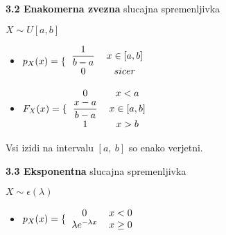 \documentclass{article}
\begin{document}
\begin{multicols}{3}
	\textbf{3.2 Enakomerna zvezna} slucajna spremenljivka
	\begin{center}
		\begin{math}
			X \sim U[a, b]
		\end{math}
	\end{center}

	\begin{itemize}
		\item  \begin{math}
			      p_{X}(x) =
			      \{\begin{tabular}{ccc}
				      $\dfrac{1}{b-a}$ & $x \in [a, b]$ & \\
				      $0$              & $sicer$        & \\
			      \end{tabular}
		      \end{math}

		\item \begin{math}
			      F_{X}(x) =
			      \{\begin{tabular}{ccc}
				      $0$                    & $x < a$        & \\
				      $\dfrac{x - a}{b - a}$ & $x \in [a, b]$ & \\
				      $1$                    & $x > b$        & \\
			      \end{tabular}
		      \end{math}
	\end{itemize}

	Vsi izidi na intervalu $[a,\: b]$ so enako verjetni.

	\textbf{3.3 Eksponentna} slucajna spremenljivka
	\begin{center}
		\begin{math}
			X \sim \epsilon(\lambda)
		\end{math}
	\end{center}

	\begin{itemize}
		\item  \begin{math}
			      p_{X}(x) =
			      \{\begin{tabular}{ccc}
				      $0$                       & $x < 0$    & \\
				      $\lambda e^{- \lambda x}$ & $x \geq 0$ & \\
			      \end{tabular}
		      \end{math}


\end{itemize}
\end{multicols}
\end{document}
